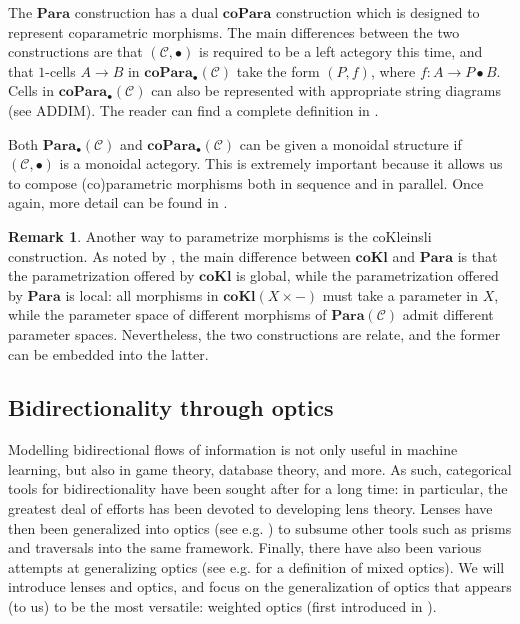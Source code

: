 \documentclass[12pt,a4paper,openright,twoside]{report}
\theoremstyle{plain}
\theoremstyle{definition}
\newtheorem{remark}[proposition]{Remark}
\begin{document}
The $\mathbf{Para}$ construction has a dual $\mathbf{coPara}$ construction which is designed to represent coparametric morphisms. The main differences between the two constructions are that $(\mathcal{C}, \bullet)$ is required to be a left actegory this time, and that $1$-cells $A \to B$ in $\mathbf{coPara}_{\bullet}(\mathcal{C})$ take the form $(P,f)$, where $f: A \to P \bullet B$.
Cells in $\mathbf{coPara}_{\bullet}(\mathcal{C})$ can also be represented with appropriate string diagrams (see ADDIM). The reader can find a complete definition in \cite{gavranovic2024fundamental}.


Both $\mathbf{Para}_{\bullet}(\mathcal{C})$ and $\mathbf{coPara}_{\bullet}(\mathcal{C})$ can be given a monoidal structure if $(\mathcal{C}, \bullet)$ is a monoidal actegory. This is extremely important because it allows us to compose (co)parametric morphisms both in sequence and in parallel. Once again, more detail can be found in \cite{gavranovic2024fundamental}.


\begin{remark}
  Another way to parametrize morphisms is the coKleinsli construction. As noted by \cite{gavranovic2024fundamental}, the main difference between $\mathbf{coKl}$ and $\mathbf{Para}$ is that the parametrization offered by $\mathbf{coKl}$ is global, while the parametrization offered by $\mathbf{Para}$ is local: all morphisms in $\mathbf{coKl}(X \times -)$ must take a parameter in $X$, while the parameter space of different morphisms of $\mathbf{Para}(\mathcal{C})$ admit different parameter spaces. Nevertheless, the two constructions are relate, and the former can be embedded into the latter.
\end{remark}




\subsection{Bidirectionality through optics}

Modelling bidirectional flows of information is not only useful in machine learning, but also in game theory, database theory, and more. As such, categorical tools for bidirectionality have been sought after for a long time: in particular, the greatest deal of efforts has been devoted to developing lens theory. Lenses have then been generalized into optics (see e.g. \cite{riley2018categories}) to subsume other tools such as prisms and traversals into the same framework. Finally, there have also been various attempts at generalizing optics (see e.g. \cite{clarke2024profunctor} for a definition of mixed optics). We will introduce lenses and optics, and focus on the generalization of optics that appears (to us) to be the most versatile: weighted optics (first introduced in \cite{gavranovic2024fundamental}). 
\end{document}
